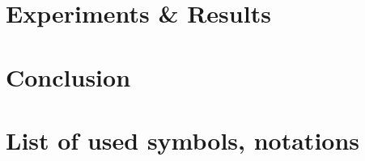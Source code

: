 \documentclass[twoside]{ctuthesis}
\theoremstyle{plain}
\theoremstyle{definition}
\theoremstyle{note}
\begin{document}
\chapter{Experiments \& Results} 
\label{results}

\chapter{Conclusion}
\label{conclusions}


\printbibliography


\chapter*{List of used symbols, notations}

\end{document}
